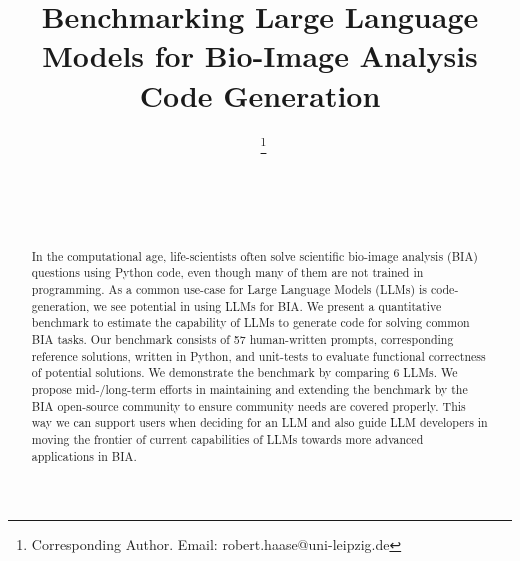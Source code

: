 \documentclass{ecai}
\begin{document}

\begin{frontmatter}




\title{Benchmarking Large Language Models for Bio-Image Analysis Code Generation}


\author[A,B]{~\thanks{Corresponding Author. Email: robert.haase@uni-leipzig.de}}
\author[C]{~}
\author[D,B]{~ } 

\address[A]{Data Science Center, Leipzig University, Humboldtstra{\ss}e 25, 04105 Leipzig, Germany}
\address[B]{Center for Scalable Data Analytics and Artificial Intelligence (ScaDS.AI) Dresden / Leipzig}
\address[C]{Data Science Centre, European Molecular Biology Laboratory, Meyerhofstra{\ss}e 1, 69117 Heidelberg, Germany}
\address[D]{Max Planck Institute for Human Cognitive and Brain Sciences, Stephanstra{\ss}e 1A, 04103, Leipzig, Germany}


\begin{abstract}
In the computational age, life-scientists often solve scientific bio-image analysis (BIA) questions using Python code, even though many of them are not trained in programming. As a common use-case for Large Language Models (LLMs) is code-generation, we see potential in using LLMs for BIA. We present a quantitative benchmark to estimate the capability of LLMs to generate code for solving common BIA tasks. Our benchmark consists of 57 human-written prompts, corresponding reference solutions, written in Python, and unit-tests to evaluate functional correctness of potential solutions. We demonstrate the benchmark by comparing 6 LLMs. We propose mid-/long-term efforts in maintaining and extending the benchmark by the BIA open-source community to ensure community needs are covered properly. This way we can support users when deciding for an LLM and also guide LLM developers in moving the frontier of current capabilities of LLMs towards more advanced applications in BIA. 
\end{abstract}


\end{frontmatter}
\end{document}

